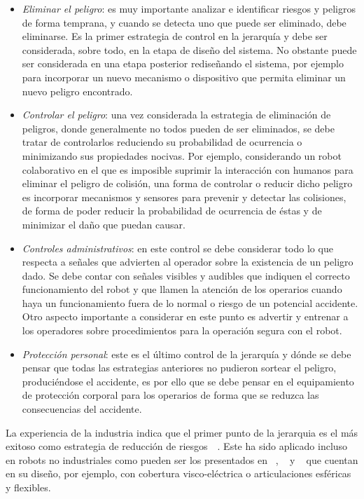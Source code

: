 \documentclass[withindex,glossary]{cam-thesis}
\begin{document}
\begin{itemize}
\item \textit{Eliminar el peligro}: es muy importante analizar e identificar riesgos y peligros de forma temprana, y cuando se detecta uno que puede ser eliminado, debe eliminarse. Es la primer estrategia de control en la jerarquía y debe ser considerada, sobre todo, en la etapa de diseño del sistema. No obstante puede ser considerada en una etapa posterior rediseñando el sistema, por ejemplo para incorporar un nuevo mecanismo o dispositivo que permita eliminar un nuevo peligro encontrado.
\item \textit{Controlar el peligro}: una vez considerada la estrategia de eliminación de peligros, donde generalmente no todos pueden de ser eliminados, se debe tratar de controlarlos reduciendo su probabilidad de ocurrencia o minimizando sus propiedades nocivas. Por ejemplo, considerando un robot colaborativo en el que es imposible suprimir la interacción con humanos para eliminar el peligro de colisión, una forma de controlar o reducir dicho peligro es incorporar mecanismos y sensores para prevenir y detectar las colisiones, de forma de poder reducir la probabilidad de ocurrencia de éstas y de minimizar el daño que puedan causar.
\item \textit{Controles administrativos}: en este control se debe considerar todo lo que respecta a señales que advierten al operador sobre la existencia de un peligro dado. Se debe contar con señales visibles y audibles que indiquen el correcto funcionamiento del robot y que llamen la atención de los operarios cuando haya un funcionamiento fuera de lo normal o riesgo de un potencial accidente. 
Otro aspecto importante a considerar en este punto es advertir y entrenar a los operadores sobre procedimientos para la operación segura con el robot.
\item \textit{Protección personal}: este es el último control de la jerarquía y dónde se debe pensar que todas las estrategias anteriores no pudieron sortear el peligro, produciéndose el accidente, es por ello que se debe pensar en el equipamiento de protección corporal para los operarios de forma que se reduzca las consecuencias del accidente.
\end{itemize}
La experiencia de la industria indica que el primer punto de la jerarquia es el más exitoso como estrategia de reducción de riesgos~\cite{ANSIRIA1506}~\cite{IEC61508}. Este ha sido aplicado incluso en robots no industriales como pueden ser los presentados en ~\cite{Yamada1997}, ~\cite{Yamada1999} y ~\cite{Bicchia} que cuentan en su diseño, por ejemplo, con cobertura visco-eléctrica o articulaciones esféricas y flexibles.
\end{document}
